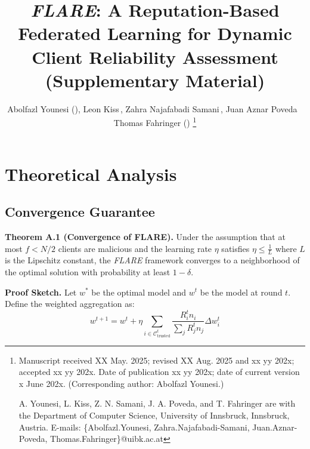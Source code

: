 \documentclass[lettersize,journal]{IEEEtran}
\begin{document}
\title{\textit{FLARE}: A Reputation-Based Federated Learning for Dynamic Client Reliability Assessment (Supplementary Material)}

\author{Abolfazl Younesi\,\,(),
Leon Kiss\,,
Zahra Najafabadi Samani\,,
Juan Aznar Poveda  \,\,
Thomas Fahringer\,\,()
\thanks{Manuscript received XX May. 2025; revised XX Aug. 2025 and xx yy 202x; accepted xx yy 202x. Date of publication xx yy 202x; date of current version x June 202x. (Corresponding author: Abolfazl Younesi.)

A. Younesi, L. Kiss, Z. N. Samani, J. A. Poveda, and T. Fahringer are with the Department of Computer Science, University of Innsbruck, Innsbruck, Austria. E-mails: \{Abolfazl.Younesi, Zahra.Najafabadi-Samani, Juan.Aznar-Poveda, Thomas.Fahringer\}@uibk.ac.at
}}


\maketitle


\section{Theoretical Analysis}

\subsection{Convergence Guarantee}

\textbf{Theorem A.1 (Convergence of FLARE).} Under the assumption that at most $f < N/2$ clients are malicious and the learning rate $\eta$ satisfies $\eta \leq \frac{1}{L}$ where $L$ is the Lipschitz constant, the \textit{FLARE} framework converges to a neighborhood of the optimal solution with probability at least $1-\delta$.

\textbf{Proof Sketch.} Let $w^*$ be the optimal model and $w^t$ be the model at round $t$. Define the weighted aggregation as:
\begin{equation}
w^{t+1} = w^t + \eta \sum_{i \in \mathcal{C}_{\text{trusted}}^t} \frac{R_i^t n_i}{\sum_{j} R_j^t n_j} \Delta w_i^t
\end{equation}
\end{document}

